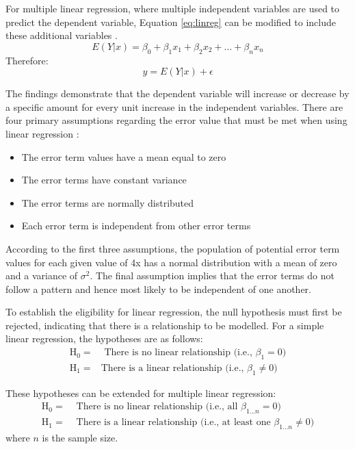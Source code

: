 \documentclass[../thesis.tex]{subfiles}
\begin{document}
For multiple linear regression, where multiple independent variables are used to predict the dependent variable, Equation \eqref{eq:linreg} can be modified to include these additional variables \cite{Hosmer1989}.
\begin{equation}
    E(Y | x) = \beta_{0} +\beta_{1}x_{1} +\beta_{2}x_{2} + ... +\beta_{n}x_{n}
\end{equation}
Therefore:
\begin{equation}
    y = E(Y | x) + \epsilon
\end{equation}

The findings demonstrate that the dependent variable will increase or decrease by a specific amount for every unit increase in the independent variables. There are four primary assumptions regarding the error value that must be met when using linear regression \cite{Bowerman2015}:
\begin{itemize}
    \item The error term values have a mean equal to zero
    \item The error terms have constant variance
    \item The error terms are normally distributed
    \item Each error term is independent from other error terms
\end{itemize}

According to the first three assumptions, the population of potential error term values for each given value of 4x  has a normal distribution with a mean of zero and a variance of $\sigma^{2}$. The final assumption implies that the error terms do not follow a pattern and hence most likely to be independent of one another.

To establish the eligibility for linear regression, the null hypothesis must first be rejected, indicating that there is a relationship to be modelled. For a simple linear regression, the hypotheses are as follows:
\begin{align}
    \text{H}_{0} =& \text{ There is no linear relationship (i.e., $\beta_{1} = 0$)}\\
    \text{H}_{1} =&\text{There is a linear relationship  (i.e., $\beta_{1} \neq 0$)}
\end{align}

These hypotheses can be extended for multiple linear regression:
\begin{align}
    \text{H}_{0} =& \text{ There is no linear relationship (i.e., all $\beta_{1...n} = 0$)}\\
    \text{H}_{1} =&\text{ There is a linear relationship (i.e., at least one $\beta_{1...n} \neq 0$)}
\end{align}
where $n$ is the sample size.
\end{document}
